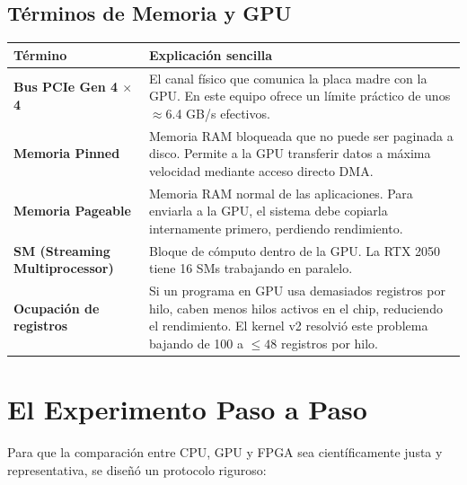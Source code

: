 \documentclass[11pt,a4paper]{article}
\begin{document}
\subsection{Términos de Memoria y GPU}
\noindent\begin{tabularx}{\linewidth}{@{}p{3.8cm} X@{}}
\toprule
\textbf{Término} & \textbf{Explicación sencilla} \\
\midrule
\textbf{Bus PCIe Gen 4 $\times$4} & El canal físico que comunica la placa madre con la GPU. En este equipo ofrece un límite práctico de unos $\approx$6.4 GB/s efectivos. \\
\addlinespace
\textbf{Memoria Pinned} & Memoria RAM bloqueada que no puede ser paginada a disco. Permite a la GPU transferir datos a máxima velocidad mediante acceso directo DMA. \\
\addlinespace
\textbf{Memoria Pageable} & Memoria RAM normal de las aplicaciones. Para enviarla a la GPU, el sistema debe copiarla internamente primero, perdiendo rendimiento. \\
\addlinespace
\textbf{SM (Streaming Multiprocessor)} & Bloque de cómputo dentro de la GPU. La RTX 2050 tiene 16 SMs trabajando en paralelo. \\
\addlinespace
\textbf{Ocupación de registros} & Si un programa en GPU usa demasiados registros por hilo, caben menos hilos activos en el chip, reduciendo el rendimiento. El kernel v2 resolvió este problema bajando de 100 a $\le 48$ registros por hilo. \\
\bottomrule
\end{tabularx}

\section{El Experimento Paso a Paso}

Para que la comparación entre CPU, GPU y FPGA sea científicamente justa y representativa, se diseñó un protocolo riguroso:
\end{document}
